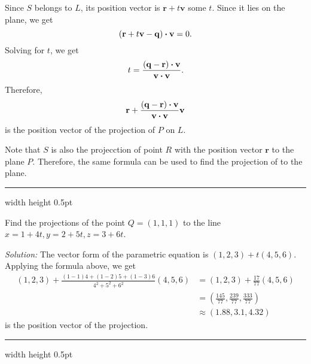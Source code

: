 Since $S$ belongs to $L$,
its position vector is  $\mathbf{r}+t\mathbf{v}$ some $t$.
Since it lies on the plane, we get
\[(\mathbf{r}+t\mathbf{v}-\mathbf{q}) \bm{\cdot} \mathbf{v}=0.\]
Solving for $t$, we get
\[t=\frac{(\mathbf{q}-\mathbf{r}) \bm{\cdot} \mathbf{v}}{\mathbf{v} \bm{\cdot} \mathbf{v}}.\]
Therefore, 
\[\mathbf{r}+\frac{(\mathbf{q}-\mathbf{r}) \bm{\cdot} \mathbf{v}}{\mathbf{v} \bm{\cdot} \mathbf{v}}\mathbf{v}\]
is the position vector of the projection of $P$ on $L$.

Note that $S$ is also the projecction of point $R$ with the position vector $\mathbf{r}$ to the plane $P$.
Therefore, the same formula can be used to find the projection of to the plane.

\hrule width \textwidth height 0.5pt
\smallskip
\begin{exmp}
\label{exmp:projection}
 Find the projections of the point $Q = (1,1,1)$ to the line $x=1+4t, y=2+5t, z=3+6t$.
 \smallskip
 \par\noindent\emph{Solution:} The vector form of the parametric equation is $(1,2,3)+t(4,5,6)$.
 Applying the formula above, we get
\begin{align*}
(1,2,3)+\frac{(1-1)4+(1-2)5+(1-3)6}{4^2+5^2+6^2}(4,5,6)
&=(1,2,3)+\frac{17}{77}(4,5,6)
\\
&=(\tfrac{145}{77},\tfrac{239}{77},\tfrac{333}{77})
\\
&\approx(1.88,3.1,4.32)
\end{align*}
is the position vector of the projection.
\end{exmp}
\hrule width \textwidth height 0.5pt

